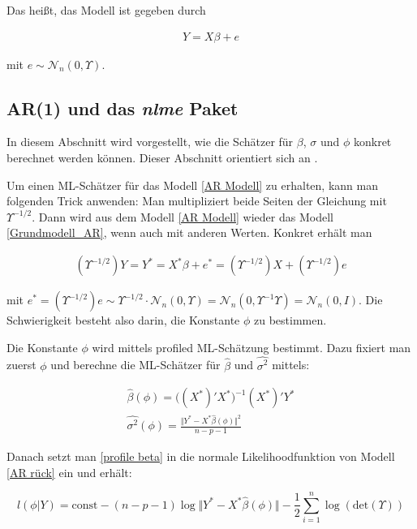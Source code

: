 \documentclass[12pt,a4paper]{article}
\theoremstyle{definition}
\theoremstyle{definition}
\theoremstyle{definition}
\theoremstyle{definition}
\begin{document}
Das heißt, das Modell ist gegeben durch 

\begin{align} \label{AR Modell}
Y = X \beta + e
\end{align}

mit $e \sim \mathscr{N}_{n}(0,\Upsilon)$.



\subsection{AR(1) und das \textit{nlme} Paket}
\label{AR(1) und das nlme Paket}

In diesem Abschnitt wird vorgestellt, wie die Schätzer für $\beta$, $\sigma$ und $\phi$ konkret berechnet werden können. Dieser Abschnitt orientiert sich an \cite[203-205]{Pinheiro00}.

Um einen ML-Schätzer für das Modell \eqref{AR Modell} zu erhalten, kann man folgenden Trick anwenden: Man multipliziert beide Seiten der Gleichung mit $\Upsilon^{-1/2}$. Dann wird aus dem Modell \eqref{AR Modell} wieder das Modell \eqref{Grundmodell_AR}, wenn auch mit anderen Werten. Konkret erhält man

\begin{align} \label{AR rück}
(\Upsilon^{-1/2})Y = Y^{*} = X^{*} \beta + e^{*} = (\Upsilon^{-1/2})X + (\Upsilon^{-1/2})e
\end{align}

mit $e^{*} = (\Upsilon^{-1/2})e \sim \Upsilon^{-1/2} \cdot \mathscr{N}_{n}(0,\Upsilon) = \mathscr{N}_{n}(0,\Upsilon^{-1}\Upsilon) = \mathscr{N}_{n}(0,I)$. Die Schwierigkeit besteht also darin, die Konstante $\phi$ zu bestimmen. 

Die Konstante $\phi$ wird mittels profiled ML-Schätzung bestimmt. Dazu fixiert man zuerst $\phi$ und berechne die ML-Schätzer für $\hat{\beta}$ und $\widehat{\sigma^2}$ mittels:

\begin{eqnarray}
\label{profile beta}
\hat{\beta}(\phi) =  \big( (X^*)' X^* \big)^{-1} (X^*)' Y^* \\
\widehat{\sigma^2}(\phi) = \frac{\Vert Y^* - X^* \hat{\beta}(\phi) \Vert^2}{n-p-1} \nonumber
\end{eqnarray}

Danach setzt man \eqref{profile beta} in die normale Likelihoodfunktion von Modell \eqref{AR rück} ein und erhält:

\begin{equation}\label{ML-phi}
l(\phi|Y) = \text{const} - (n-p-1) \log \Vert Y^* - X^* \hat{\beta}(\phi) \Vert - \frac{1}{2} \sum^n_{i=1} \log( \text{det} (\Upsilon) )
\end{equation}
\end{document}
